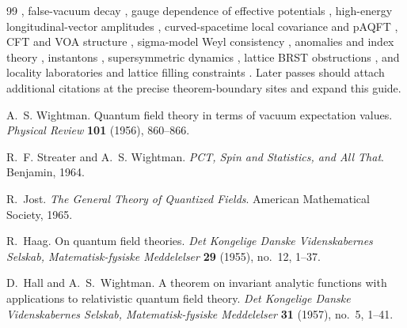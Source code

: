 \begin{thebibliography}{99}
\cite{WeinbergWitten1980,Loebbert2008WeinbergWitten,
BenedettiCasiniMagan2022Noether},
false-vacuum decay
\cite{Coleman1977FalseVacuum,CallanColeman1977Fate,ColemanDeLuccia1980},
gauge dependence of effective potentials
\cite{Nielsen1975GaugeDependence,FukudaKugo1976GaugeEffectiveAction,
AitchisonFraser1984GaugeEffectivePotential,MetaxasWeinberg1996BubbleGauge},
high-energy longitudinal-vector amplitudes
\cite{CornwallLevinTiktopoulos1974,LeeQuiggThacker1977,
ChanowitzGaillard1985,Veltman1990EquivalenceTheorem,BaggerSchmidt1990},
curved-spacetime local covariance and pAQFT
\cite{BrunettiFredenhagenVerch2003,BrunettiFredenhagenKoehler1996,
Radzikowski1996,KayWald1991,
Moretti2003StressEnergy,HollandsWald2001LocalWick,
HollandsWald2005Conservation,HollandsWald2015QFCS},
CFT and
VOA structure
\cite{Segal2004,KontsevichSegal2021,Zhu1996,Huang2005,DO1994,ZZ1996},
sigma-model Weyl consistency
\cite{CurciPaffuti1987,SchnittgerEllwanger1992}, anomalies and index
theory
\cite{AdlerBardeen1969,Bardeen1969AnomalousWard,PiguetSorella1995,
BarnichBrandtHenneaux2000,Anselmi2014AdlerBardeen,Seeley1967,Gilkey1984,
AtiyahSinger1968,APS1975I,APS1975II,APS1976III,
BismutFreed1986,DaiFreed1994,Freed1995DeterminantRevisited,Witten1982}, instantons
\cite{tHooft1976Pseudoparticle}, supersymmetric dynamics
\cite{SeibergWitten1994I,SeibergWitten1994II,Seiberg1994}, lattice BRST
obstructions \cite{Neuberger1986NonperturbativeBRS,Neuberger1987BRSGribov},
and locality laboratories and lattice filling constraints
\cite{LiebRobinson1972,LiebSchultzMattis1961,Oshikawa2000Commensurability,
BachmannMichalakisNachtergaeleSims2012Automorphic,Hastings2004LSMHigher}.
Later passes should attach additional
citations at the precise theorem-boundary sites and expand this guide.

A.~S. Wightman.
Quantum field theory in terms of vacuum expectation values.
\emph{Physical Review} \textbf{101} (1956), 860--866.

R.~F. Streater and A.~S. Wightman.
\emph{PCT, Spin and Statistics, and All That}.
Benjamin, 1964.

R.~Jost.
\emph{The General Theory of Quantized Fields}.
American Mathematical Society, 1965.

R.~Haag.
On quantum field theories.
\emph{Det Kongelige Danske Videnskabernes Selskab, Matematisk-fysiske
Meddelelser} \textbf{29} (1955), no.~12, 1--37.

D.~Hall and A.~S.~Wightman.
A theorem on invariant analytic functions with applications to relativistic
quantum field theory.
\emph{Det Kongelige Danske Videnskabernes Selskab, Matematisk-fysiske
Meddelelser} \textbf{31} (1957), no.~5, 1--41.


\end{thebibliography}
